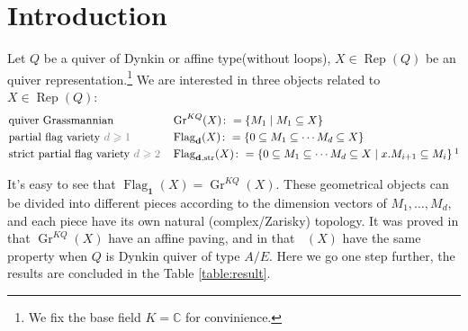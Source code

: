 \documentclass[reqno,11pt]{amsart}
\numberwithin{equation}{section}
\theoremstyle{plain}
\theoremstyle{plain}
\numberwithin{equation}{section}
\theoremstyle{remark}
\DeclareMathOperator{\Rep}{\operatorname{Rep}}
\DeclareMathOperator{\Flagd}{\operatorname{Flag}_{\mathbf{d}}}
\DeclareMathOperator{\Flagdstr}{\operatorname{Flag}_{\mathbf{d},str}}
\newcommand{\Grq}{\operatorname{Gr}^{KQ}}
\newcommand{\Flag}[1]{\operatorname{Flag}_{\mathbf{#1}}}
\begin{document}
\section{Introduction}
Let $Q$ be a quiver of Dynkin or affine type(without loops), $X\in \Rep(Q)$ be an quiver representation.\footnote{We fix the base field $K=\mathbb{C}$ for convinience.} We are interested in three objects related to $X \in \Rep(Q)$:
\begin{equation*}
\begin{aligned}
&	\text{quiver Grassmannian} && \Grq(X)\colon = \left\{ M_1 \mid M_1 \subseteq X \right\}\\
&	\text{partial flag variety \textcolor{gray}{$d\geqslant 1$}} && \Flagd(X)\colon =\left\{ 0 \subseteq M_1 \subseteq \cdots M_d \subseteq X \right\}\\
&	\text{strict partial flag variety \textcolor{gray}{$d\geqslant 2$}} && \Flagdstr(X)\colon =\left\{ 0 \subseteq M_1 \subseteq \cdots M_d \subseteq X  \mid x.M_{i+1} \subseteq M_i\right\}\footnotemark\\
\end{aligned}
\end{equation*}

It's easy to see that $\Flag{1}(X)=\Grq(X)$. These geometrical objects can be divided into different pieces according to the dimension vectors of $M_1,\ldots,M_d$, and each piece have its own natural (complex/Zarisky) topology. It was proved in \cite{irelli2019cell} that $\Grq(X)$ have an affine paving, and in \cite{maksimau2019flag} that $\Flagd(X)$ have the same property when $Q$ is Dynkin quiver of type $A/E$. Here we go one step further, the results are concluded in the Table \ref{table:result}.
\end{document}

